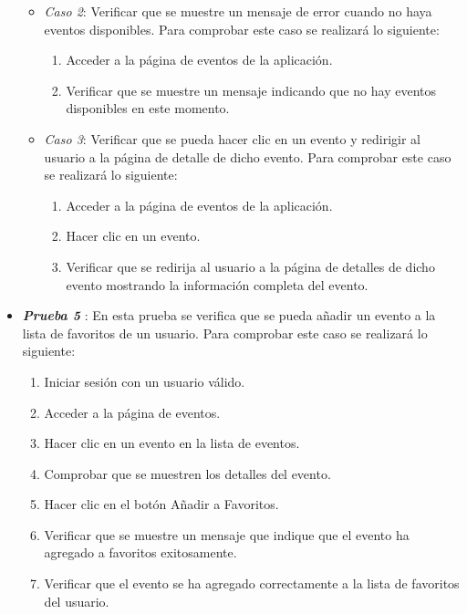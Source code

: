 \begin{itemize}
    \begin{itemize}
        \item \textit{Caso 2}:
    Verificar que se muestre un mensaje de error cuando no haya eventos disponibles. Para comprobar este caso se realizará lo siguiente:
   \begin{enumerate}
       \item Acceder a la página de eventos de la aplicación.
       \item Verificar que se muestre un mensaje indicando que no hay eventos disponibles en este momento.
   \end{enumerate}
    \end{itemize}

    \begin{itemize}
        \item \textit{Caso 3}:
    Verificar que se pueda hacer clic en un evento y redirigir al usuario a la página de detalle de dicho evento. Para comprobar este caso se realizará lo siguiente:
   \begin{enumerate}
       \item Acceder a la página de eventos de la aplicación.
       \item Hacer clic en un evento.
       \item Verificar que se redirija al usuario a la página de detalles de dicho evento mostrando la información completa del evento.
   \end{enumerate}
    \end{itemize}

 \item \textbf{\textit{Prueba 5}} \label{Prueba5}: En esta prueba se verifica que se pueda añadir un evento a la lista de favoritos de un usuario. Para comprobar este caso se realizará lo siguiente:
 
   \begin{enumerate}
        \item Iniciar sesión con un usuario válido. 
       \item Acceder a la página de eventos.
       \item Hacer clic en un evento en la lista de eventos.
       \item Comprobar que se muestren los detalles del evento.
       \item Hacer clic en el botón Añadir a Favoritos.
       \item Verificar que se muestre un mensaje que indique que el evento ha agregado a favoritos exitosamente.
       \item Verificar que el evento se ha agregado correctamente a la lista de favoritos del usuario.
   \end{enumerate}


\end{itemize}
